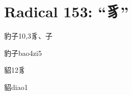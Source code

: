 
\section*{Radical 153: ``⾘''}

\begin{entry}{豹子}{10,3}{⾘、⼦}
  \begin{phonetics}{豹子}{bao4zi5}
  \end{phonetics}
\end{entry}

\begin{entry}{貂}{12}{⾘}
  \begin{phonetics}{貂}{diao1}
  \end{phonetics}
\end{entry}


